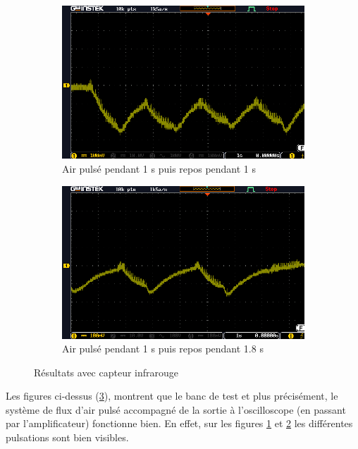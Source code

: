 \begin{figure}[H]
    \centering
    \begin{subfigure}[b]{0.45\textwidth}
        \hspace{-1 cm}
        \includegraphics[scale = 0.45]{assets/figures/CapteurIR_1s_1s.PNG}
        \caption{Air pulsé pendant 1 s puis repos pendant 1 s}
        \label{fig:1s1s}
    \end{subfigure}
    \begin{subfigure}[b]{0.45\textwidth}
        \centering
        \includegraphics[scale = 0.45]{assets/figures/1_8s_repos.PNG}
        \caption{Air pulsé pendant 1 s puis repos pendant 1.8 s}
        \label{fig:1_8s}
    \end{subfigure}
    \caption{Résultats avec capteur infrarouge}
    \label{fig:capteurIR}
\end{figure}

Les figures ci-dessus (\ref{fig:capteurIR}), montrent que le banc de test et plus précisément, le système de flux d'air pulsé accompagné de
la sortie à l'oscilloscope (en passant par l'amplificateur) fonctionne bien. En effet, sur les figures \ref*{fig:1s1s} et \ref*{fig:1_8s}
les différentes pulsations sont bien visibles.\\

